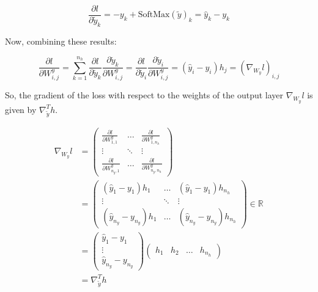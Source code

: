 \documentclass{article}
\theoremstyle{plain}%
\theoremstyle{definition}
\theoremstyle{remark}
\begin{document}
\[
    \frac{\partial l}{\partial \tilde{y}_k} = -y_k + \text{SoftMax}(\tilde{y})_k = \hat{y}_k - y_k
\]

Now, combining these results:

\[
    \frac{\partial l}{\partial W_{i,j}^y} = \sum_{k=1}^{n_h} \frac{\partial l}{\partial \tilde{y}_k} \frac{\partial \tilde{y}_k}{\partial W_{i,j}^y} =  \frac{\partial l}{\partial \tilde{y}_i} \frac{\partial \tilde{y}_i}{\partial W_{i,j}^y} = (\hat{y}_i - y_i) h_j = (\nabla _{W_y} l)_{i,j}
\]

So, the gradient of the loss with respect to the weights of the output layer \( \nabla_{W_y} l \) is given by \( \nabla _{\tilde{y}} ^T h \).

\begin{align*}
    \nabla_{W_y} l & = \begin{pmatrix}
                           \frac{\partial l}{\partial W^y_{1,1}}   & \dots  & \frac{\partial l}{\partial W^y_{1,n_h}}    \\
                           \vdots                                  & \ddots & \vdots                                     \\
                           \frac{\partial l}{\partial W^y_{n_y,1}} & \dots  & \frac{\partial l}{\partial W^y_{n_y, n_h}}
                       \end{pmatrix} \\
                   & = \begin{pmatrix}
                           (\hat{y}_1 - y_1) h_{1}         & \dots  & (\hat{y}_1 - y_1) h_{n_h}         \\
                           \vdots                          & \ddots & \vdots                            \\
                           (\hat{y}_{n_y} - y_{n_y}) h_{1} & \dots  & (\hat{y}_{n_y} - y_{n_y}) h_{n_h}
                       \end{pmatrix} \in \mathbb{R}^{}                  \\
                   & = \begin{pmatrix}
                           \hat{y}_1 - y_1 \\
                           \vdots          \\
                           \hat{y}_{n_y} - y_{n_y}
                       \end{pmatrix} \begin{pmatrix}
                                         h_1 & h_2 & \dots & h_{n_h}
                                     \end{pmatrix}                                                     \\
                   & = \nabla _{\tilde{y}} ^T h
\end{align*}
\end{document}
